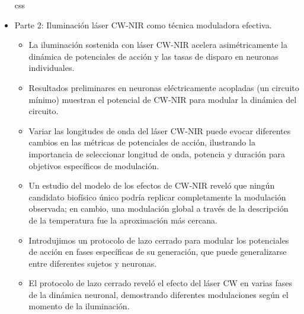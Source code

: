 \begin{itemize}
	css
	
	\item Parte 2: Iluminación láser CW-NIR como técnica moduladora efectiva.
	\begin{itemize}
		\item La iluminación sostenida con láser CW-NIR acelera asimétricamente la dinámica de potenciales de acción y las tasas de disparo en neuronas individuales.
		\item Resultados preliminares en neuronas eléctricamente acopladas (un circuito mínimo) muestran el potencial de CW-NIR para modular la dinámica del circuito.
		\item Variar las longitudes de onda del láser CW-NIR puede evocar diferentes cambios en las métricas de potenciales de acción, ilustrando la importancia de seleccionar longitud de onda, potencia y duración para objetivos específicos de modulación.
		\item Un estudio del modelo de los efectos de CW-NIR reveló que ningún candidato biofísico único podría replicar completamente la modulación observada; en cambio, una modulación global a través de la descripción de la temperatura fue la aproximación más cercana.
		\item Introdujimos un protocolo de lazo cerrado para modular los potenciales de acción en fases específicas de su generación, que puede generalizarse entre diferentes sujetos y neuronas.
		\item El protocolo de lazo cerrado reveló el efecto del láser CW en varias fases de la dinámica neuronal, demostrando diferentes modulaciones según el momento de la iluminación.
	\end{itemize}
	
\end{itemize}
